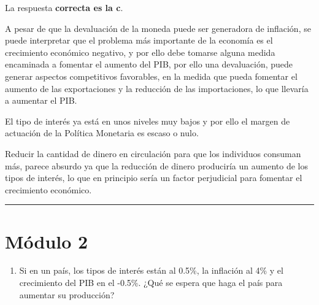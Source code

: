 \documentclass[
  letterpaper,
  DIV=11,
  numbers=noendperiod]{scrreprt}
\providecommand{\tightlist}{%
  \setlength{\itemsep}{0pt}\setlength{\parskip}{0pt}}\usepackage{longtable,booktabs,array}
\begin{document}
\begin{tcolorbox}[enhanced jigsaw, opacityback=0, bottomrule=.15mm, colframe=quarto-callout-tip-color-frame, arc=.35mm, leftrule=.75mm, breakable, colback=white, rightrule=.15mm, toprule=.15mm, left=2mm]
\begin{minipage}[t]{5.5mm}
\textcolor{quarto-callout-tip-color}{\faLightbulb}
\end{minipage}%
\begin{minipage}[t]{\textwidth - 5.5mm}

La respuesta \textbf{correcta es la c}.

A pesar de que la devaluación de la moneda puede ser generadora de
inflación, se puede interpretar que el problema más importante de la
economía es el crecimiento económico negativo, y por ello debe tomarse
alguna medida encaminada a fomentar el aumento del PIB, por ello una
devaluación, puede generar aspectos competitivos favorables, en la
medida que pueda fomentar el aumento de las exportaciones y la reducción
de las importaciones, lo que llevaría a aumentar el PIB.

El tipo de interés ya está en unos niveles muy bajos y por ello el
margen de actuación de la Política Monetaria es escaso o nulo.

Reducir la cantidad de dinero en circulación para que los individuos
consuman más, parece absurdo ya que la reducción de dinero produciría un
aumento de los tipos de interés, lo que en principio sería un factor
perjudicial para fomentar el crecimiento económico.

\end{minipage}%
\end{tcolorbox}

\begin{center}\rule{0.5\linewidth}{0.5pt}\end{center}

\hypertarget{muxf3dulo-2}{%
\chapter*{Módulo 2}\label{muxf3dulo-2}}


\begin{enumerate}
\def\labelenumi{\arabic{enumi}.}
\tightlist
\item
  Si en un país, los tipos de interés están al 0.5\%, la inflación al
  4\% y el crecimiento del PIB en el -0.5\%. ¿Qué se espera que haga el
  país para aumentar su producción?
\end{enumerate}
\end{document}
